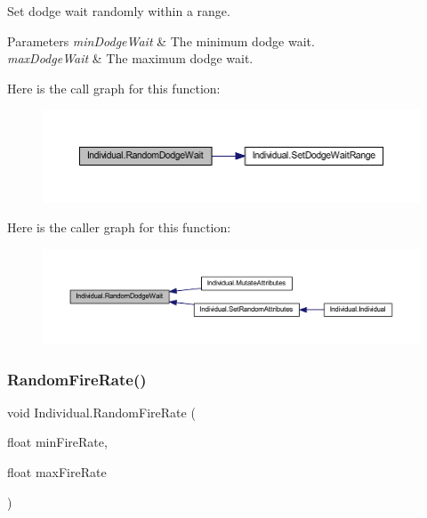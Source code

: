 Set dodge wait randomly within a range. 


\begin{DoxyParams}{Parameters}
{\em min\+Dodge\+Wait} & The minimum dodge wait.\\
\hline
{\em max\+Dodge\+Wait} & The maximum dodge wait.\\
\hline
\end{DoxyParams}
Here is the call graph for this function\+:\nopagebreak
\begin{figure}[H]
\begin{center}
\leavevmode
\includegraphics[width=350pt]{class_individual_a1ac91351958ff89363dac0c16612f07d_cgraph}
\end{center}
\end{figure}
Here is the caller graph for this function\+:\nopagebreak
\begin{figure}[H]
\begin{center}
\leavevmode
\includegraphics[width=350pt]{class_individual_a1ac91351958ff89363dac0c16612f07d_icgraph}
\end{center}
\end{figure}
\mbox{\label{class_individual_ad6ad54b9dd02fcb02b5a11738585d41c}} 
\subsubsection{\texorpdfstring{Random\+Fire\+Rate()}{RandomFireRate()}}
{\footnotesize\ttfamily void Individual.\+Random\+Fire\+Rate (\begin{DoxyParamCaption}\item[{float}]{min\+Fire\+Rate,  }\item[{float}]{max\+Fire\+Rate }\end{DoxyParamCaption})}



